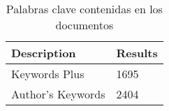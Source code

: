\begin{table}[htbp]
	\centering
	\begin{tabular}{|l|l|}
		\hline
		\textbf{Description} & \textbf{Results} \\ \hline
		Keywords Plus & 1695 \\ \hline
		Author's Keywords & 2404 \\ \hline
	\end{tabular}
	\caption{Palabras clave contenidas en los documentos}
	\label{tb:keywords}
\end{table}